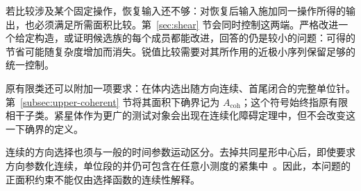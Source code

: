 若比较涉及某个固定操作，恢复输入还不够：对恢复后输入施加同一操作所得的输出，也必须满足所需面积比较。第~\ref{sec:shear} 节会同时控制这两端。严格改进一个给定构造，或证明候选族的每个成员都能改进，回答的仍是较小的问题：可得的节省可能随复杂度增加而消失。锐值比较需要对其所作用的近极小序列保留足够的统一控制。

原有限类还可以附加一项要求：在体内选出随方向连续、首尾闭合的完整单位针。第~\ref{subsec:upper-coherent} 节将其面积下确界记为 $A_{\mathrm{coh}}$；这个符号始终指原有限相干子类。紧星体作为更广的测试对象会出现在连续化障碍定理中，但不会改变这一下确界的定义。


连续的方向选择也须与一般的时间参数运动区分。去掉共同星形中心后，即使要求方向参数化连续，单位段的并仍可包含在任意小测度的紧集中~\cite[定理~3.3]{JarvenpaaEtAl2011}。因此，本问题的正面积约束不能仅由选择函数的连续性解释。

